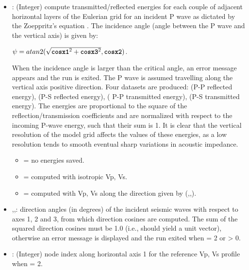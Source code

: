 \begin{itemize}
	\item {}: (Integer) compute transmitted/reflected energies for each couple of adjacent horizontal layers of the Eulerian grid for an incident P wave as dictated by the Zoeppritz’s equation \citep{akirichards2002book}. The incidence angle (angle between the P wave and the vertical axis) is given by: 
	\begin{center}
	$\psi = atan2(\sqrt{\textbf{\texttt{cosx1}}^2+\textbf{\texttt{cosx3}}^2 },\textbf{\texttt{cosx2}})$. \\
	\end{center}
	When the incidence angle is larger than the critical angle, an error message appears and the run is exited. The P wave is assumed travelling along the vertical axis positive direction. Four datasets are produced:  (P-P reflected energy),  (P-S reflected energy),  ( P-P transmitted energy),  (P-S transmitted energy). The energies are proportional to the square of the reflection/transmission coefficients and are normalized with respect to the incoming P-wave energy, such that their sum is 1. It is clear that the vertical resolution of the model grid affects the values of these  energies, as a low resolution tends to smooth eventual sharp variations in acoustic impedance.

    \begin{itemize}
        \item[]  = no  energies saved.
        \item[]  =  computed with isotropic Vp, Vs.
        \item[]  =  computed with Vp, Vs along the direction given by (,,).
    \end{itemize}
    
	\item {},,: direction angles (in degrees) of the incident seismic waves with respect to axes 1, 2 and 3, from which direction cosines are computed. The sum of the squared direction cosines must be 1.0 (i.e., should yield a unit vector), otherwise an error message is displayed and the run exited when  = 2 or  > 0. 
	
	\item {}: (Integer) node index along horizontal axis 1 for the reference Vp, Vs profile when  = 2.
	

\end{itemize}

